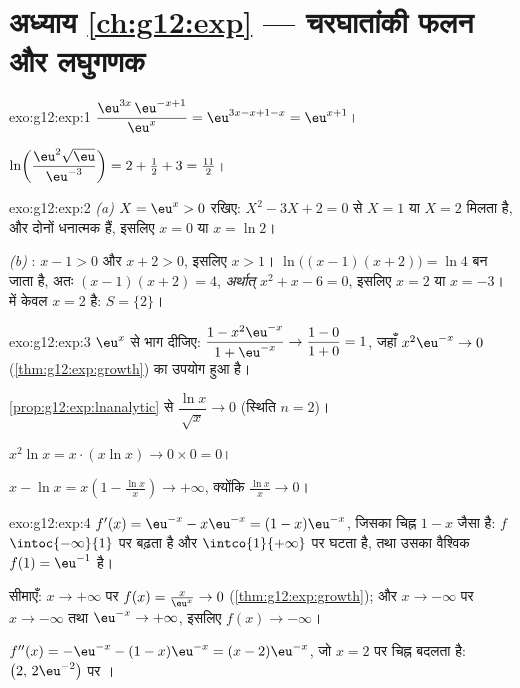\section*{अध्याय \ref{ch:g12:exp} --- चरघातांकी फलन और लघुगणक}

\begin{solution}{exo:g12:exp:1}
$\dfrac{\eu^{3x}\,\eu^{-x+1}}{\eu^{x}} = \eu^{3x - x + 1 - x} = \eu^{x+1}$।

$\ln\!\left(\dfrac{\eu^2\sqrt{\eu}}{\eu^{-3}}\right)
= 2 + \tfrac12 + 3 = \tfrac{11}{2}$।
\end{solution}

\begin{solution}{exo:g12:exp:2}
\emph{(a)} $X = \eu^x > 0$ रखिए: $X^2 - 3X + 2 = 0$ से $X = 1$ या $X = 2$ मिलता है, और दोनों धनात्मक हैं, इसलिए
$x = 0$ या $x = \ln 2$।

\emph{(b)} : $x - 1 > 0$ और $x + 2 > 0$, इसलिए $x > 1$।  $\ln\bigl((x-1)(x+2)\bigr) = \ln 4$ बन जाता है, अतः
$(x-1)(x+2) = 4$, \emph{अर्थात्} $x^2 + x - 6 = 0$, इसलिए $x = 2$ या $x = -3$।  में केवल $x = 2$ है: $S = \{2\}$।
\end{solution}

\begin{solution}{exo:g12:exp:3}
$\eu^x$ से भाग दीजिए: $\dfrac{1 - x^2\eu^{-x}}{1 + \eu^{-x}} \to \dfrac{1-0}{1+0} = 1$, जहाँ $x^2 \eu^{-x} \to 0$ (\cref{thm:g12:exp:growth}) का उपयोग हुआ है।

\cref{prop:g12:exp:lnanalytic} से $\dfrac{\ln x}{\sqrt x} \to 0$ (स्थिति $n = 2$)।

$x^2 \ln x = x \cdot (x \ln x) \to 0 \times 0 = 0$।

$x - \ln x = x\left(1 - \frac{\ln x}{x}\right) \to +\infty$, क्योंकि $\frac{\ln x}{x} \to 0$।
\end{solution}

\begin{solution}{exo:g12:exp:4}
$f'(x) = \eu^{-x} - x\eu^{-x} = (1 - x)\eu^{-x}$, जिसका चिह्न $1 - x$ जैसा है: $f$ $\intoc{-\infty}{1}$ पर बढ़ता है और $\intco{1}{+\infty}$ पर घटता है, तथा
उसका वैश्विक  $f(1) = \eu^{-1}$ है।

सीमाएँ: $x \to +\infty$ पर $f(x) = \frac{x}{\eu^x} \to 0$ (\cref{thm:g12:exp:growth}); और $x \to -\infty$ पर $x \to -\infty$ तथा $\eu^{-x} \to +\infty$, इसलिए $f(x) \to -\infty$।

$f''(x) = -\eu^{-x} - (1-x)\eu^{-x} = (x - 2)\eu^{-x}$, जो $x = 2$ पर चिह्न बदलता है: $\bigl(2,\, 2\eu^{-2}\bigr)$ पर ।
\end{solution}

